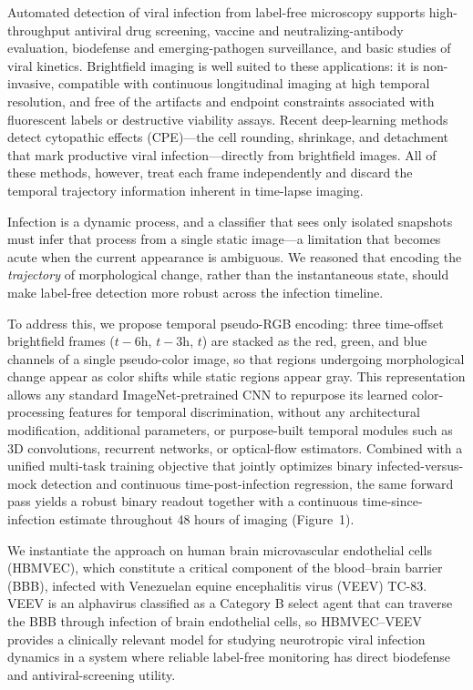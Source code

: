 \documentclass[12pt,letterpaper]{article}
\begin{document}
Automated detection of viral infection from label-free microscopy supports high-throughput antiviral drug screening, vaccine and neutralizing-antibody evaluation, biodefense and emerging-pathogen surveillance, and basic studies of viral kinetics.\cite{ref-morens2004emerging,ref-woolhouse2005emerging,ref-zandi2019cpe}
Brightfield imaging is well suited to these applications: it is non-invasive, compatible with continuous longitudinal imaging at high temporal resolution, and free of the artifacts and endpoint constraints associated with fluorescent labels or destructive viability assays.\cite{ref-riss2016assay,ref-petkidis2023review}
Recent deep-learning methods detect cytopathic effects (CPE)---the cell rounding, shrinkage, and detachment that mark productive viral infection---directly from brightfield images.\cite{ref-andriasyan2021iscience,ref-petkidis2024natcomm,ref-chen2022biomedicines,ref-airvic2025}
All of these methods, however, treat each frame independently and discard the temporal trajectory information inherent in time-lapse imaging.

Infection is a dynamic process, and a classifier that sees only isolated snapshots must infer that process from a single static image---a limitation that becomes acute when the current appearance is ambiguous.\cite{ref-wang2020cpe,ref-hsiung1994cpe,ref-leland2007cpe} We reasoned that encoding the \emph{trajectory} of morphological change, rather than the instantaneous state, should make label-free detection more robust across the infection timeline.

To address this, we propose temporal pseudo-RGB encoding: three time-offset brightfield frames ($t{-}6$h, $t{-}3$h, $t$) are stacked as the red, green, and blue channels of a single pseudo-color image, so that regions undergoing morphological change appear as color shifts while static regions appear gray.
This representation allows any standard ImageNet-pretrained CNN to repurpose its learned color-processing features for temporal discrimination, without any architectural modification, additional parameters, or purpose-built temporal modules such as 3D convolutions, recurrent networks, or optical-flow estimators.
Combined with a unified multi-task training objective that jointly optimizes binary infected-versus-mock detection and continuous time-post-infection regression, the same forward pass yields a robust binary readout together with a continuous time-since-infection estimate throughout 48 hours of imaging (Figure~1).

We instantiate the approach on human brain microvascular endothelial cells (HBMVEC), which constitute a critical component of the blood--brain barrier (BBB),\cite{ref-daneman2015bbb,ref-abbott2010bbb} infected with Venezuelan equine encephalitis virus (VEEV) TC-83.
VEEV is an alphavirus classified as a Category B select agent that can traverse the BBB through infection of brain endothelial cells,\cite{ref-weaver2004veev,ref-schafer2011vee,ref-salimi2020mbio} so HBMVEC--VEEV provides a clinically relevant model for studying neurotropic viral infection dynamics in a system where reliable label-free monitoring has direct biodefense and antiviral-screening utility.
\end{document}
